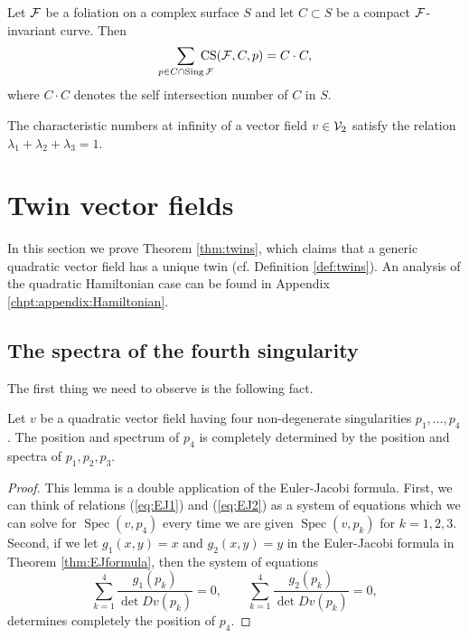 \documentclass[phd,tocprelim]{cornell}
\begin{document}
\begin{theorem}
 Let $\mathcal{F}$ be a foliation on a complex surface $S$ and let $C\subset S$ be a compact $\mathcal{F}$-invariant curve. Then
  \[ \sum_{p\in C\cap\operatorname{Sing}\F}\hspace{-12pt}\CSindex{\F}{C}{p} = C\cdot C, \]
 where $C\cdot C$ denotes the self intersection number of $C$ in $S$.
\end{theorem}

\begin{corollary}
  The characteristic numbers at infinity of a vector field $v\in\mathcal{V}_2$ satisfy the relation $\lambda_1+\lambda_2+\lambda_3 = 1$.
\end{corollary}




\section{Twin vector fields}

In this section we prove Theorem \ref{thm:twins}, which claims that a generic quadratic vector field has a unique twin (cf. Definition \ref{def:twins}). An analysis of the quadratic Hamiltonian case can be found in Appendix \ref{chpt:appendix:Hamiltonian}.

\subsection{The spectra of the fourth singularity}

The first thing we need to observe is the following fact.

\begin{lemma}\label{lemma:3outOf4}
Let $v$ be a quadratic vector field having four non-degenerate singularities $p_1,\ldots,p_4$. The position and spectrum of $p_4$ is completely determined by the position and spectra of $p_1,p_2,p_3$.
\end{lemma}

\begin{proof}
This lemma is a double application of the Euler-Jacobi formula. First, we can think of relations (\ref{eq:EJ1}) and (\ref{eq:EJ2}) as a system of equations which we can solve for $\operatorname{Spec}(v,p_4)$ every time we are given $\operatorname{Spec}(v,p_k)$ for $k=1,2,3$. Second, if we let $g_1(x,y)=x$ and $g_2(x,y)=y$ in the Euler-Jacobi formula in Theorem \ref{thm:EJformula}, then the system of equations 
\[ \sum_{k=1}^4 \frac{g_1(p_k)}{\det{Dv(p_k)}}=0,\qquad \sum_{k=1}^4 \frac{g_2(p_k)}{\det{Dv(p_k)}}=0, \]
determines completely the position of $p_4$.
\end{proof}
\end{document}
